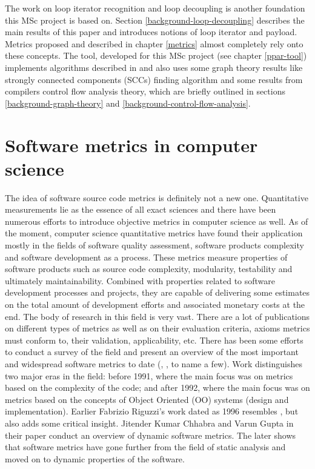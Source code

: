 \null\qquad The work on loop iterator recognition  and loop decoupling \cite{iterator-recognition-paper} is another foundation this MSc project is based on. Section \ref{background-loop-decoupling} describes the main results of this paper and introduces notions of loop iterator and payload. Metrics proposed and described in chapter \ref{metrics} almost completely rely onto these concepts. The tool, developed for this MSc project (see chapter \ref{ppar-tool}) implements algorithms described in \cite{iterator-recognition-paper} and also uses some graph theory results like strongly connected components (SCCs) finding algorithm and some results from compilers control flow analysis theory, which are briefly outlined in sections \ref{background-graph-theory} and \ref{background-control-flow-analysis}.

\section{Software metrics in computer science} \label{background-software-metrics-in-cs}
\qquad The idea of software source code metrics is definitely not a new one. Quantitative measurements lie as the essence of all exact sciences and there have been numerous efforts to introduce objective metrics in computer science as well. As of the moment, computer science quantitative metrics have found their application mostly in the fields of software quality assessment, software products complexity and software development as a process. These metrics measure
properties of software products such as source code complexity, modularity,
testability and ultimately maintainability. Combined with properties related to
software development processes and projects, they are capable of delivering some
estimates on the total amount of development efforts and associated monetary costs at the end.\newline 
\null\qquad The body of research in this field is very vast. There are a lot of publications on different types of metrics as well as on their evaluation criteria, axioms metrics must conform to, their validation, applicability, etc. There has been some efforts to conduct a survey of the field and present an overview of the most important and widespread software metrics to date (\cite{metrics-survey-0-paper}, \cite{metrics-survey-1-paper}, \cite{metrics-survey-dynamic-paper} to name a few). Work \cite{metrics-survey-1-paper} distinguishes two major eras in the field: before 1991, where the main focus was on metrics based on the complexity of the code; and after 1992, where the main focus was on metrics based on the concepts of Object Oriented (OO) systems (design and implementation). Earlier Fabrizio Riguzzi's work \cite{metrics-survey-0-paper} dated as 1996 resembles \cite{metrics-survey-1-paper}, but also adds some critical insight. Jitender Kumar Chhabra and Varun Gupta in their paper \cite{metrics-survey-dynamic-paper} conduct an overview of dynamic software metrics. The later shows that software metrics have gone further from the field of static analysis and moved on to dynamic properties of the software.

